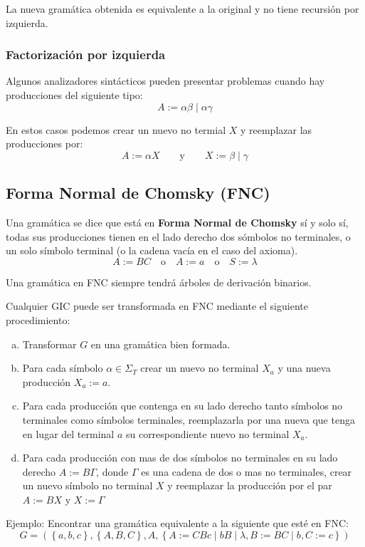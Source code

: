 \documentclass[12pt]{article}
\begin{document}
La nueva gramática obtenida es equivalente a la original y no tiene recursión por izquierda.

\subsubsection{Factorización por izquierda}
Algunos analizadores sintácticos pueden presentar problemas cuando hay producciones del siguiente tipo:
\[
A:= \alpha\beta \mid \alpha\gamma
\]

En estos casos podemos crear un nuevo no termial $ X $ y reemplazar las producciones por:
\[
A:=\alpha X \qquad \text{y} \qquad X:=\beta \mid \gamma
\]

\subsection{Forma Normal de Chomsky (FNC)}
Una gramática se dice que está en \textbf{Forma Normal de Chomsky} sí y solo sí, todas sus producciones tienen en el lado derecho dos sómbolos no terminales, o un solo símbolo terminal (o la cadena vacía en el caso del axioma).
\[
A:=BC \quad \text{o} \quad A:=a \quad \text{o} \quad S:=\lambda
\]

Una gramática en FNC siempre tendrá árboles de derivación binarios.

Cualquier GIC puede ser transformada en FNC mediante el siguiente procedimiento:
\begin{enumerate}[a)]
  \item Transformar $ G $ en una gramática bien formada.

  \item Para cada símbolo $ \alpha \in \Sigma_{T} $ crear un nuevo no terminal $ X_{a} $ y una nueva producción $ X_{a}:=a $.

  \item Para cada producción que contenga en su lado derecho tanto símbolos no terminales como símbolos terminales, reemplazarla por una nueva que tenga en lugar del terminal $ a $ su correspondiente nuevo no terminal $ X_{a} $. 

  \item Para cada producción con mas de dos símbolos no terminales en su lado derecho $ A:=B\Gamma $, donde $ \Gamma $ es una cadena de dos o mas no terminales, crear un nuevo símbolo no terminal $ X $ y reemplazar la producción por el par $ A:=BX $ y $ X:=\Gamma $ 
\end{enumerate}

Ejemplo: Encontrar una gramática equivalente a la siguiente que esté en FNC:
\[
G = \left(\left\{a,b,c\right\},\left\{A,B,C\right\},A,\left\{A:=CBc \mid bB \mid \lambda,B:=BC \mid b,C:=c\right\}\right)
\]
\end{document}
